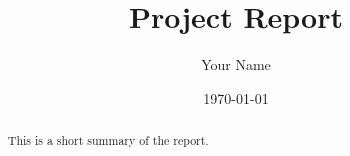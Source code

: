 \documentclass[11pt,a4paper]{article}
\title{Project Report}
\author{Your Name}
\date{\today}
\begin{document}
\maketitle

\begin{abstract}
This is a short summary of the report.
\end{abstract}

\tableofcontents
\newpage





\end{document}
